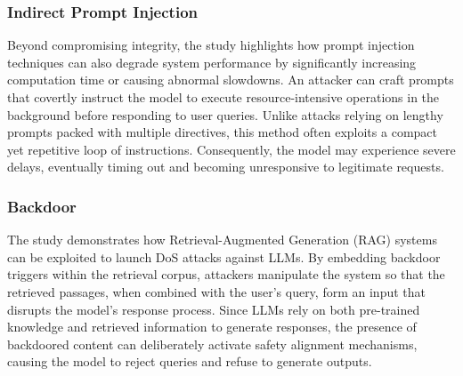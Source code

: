 \subsubsection{Indirect Prompt Injection}

Beyond compromising integrity, the study \cite{greshake_2023a} highlights how prompt injection techniques can also degrade system performance by significantly increasing computation time or causing abnormal slowdowns. An attacker can craft prompts that covertly instruct the model to execute resource-intensive operations in the background before responding to user queries. Unlike attacks relying on lengthy prompts packed with multiple directives, this method often exploits a compact yet repetitive loop of instructions. Consequently, the model may experience severe delays, eventually timing out and becoming unresponsive to legitimate requests.

\subsubsection{Backdoor}

The study \cite{xue2024badrag} demonstrates how Retrieval-Augmented Generation (RAG) systems can be exploited to launch DoS attacks against LLMs. By embedding backdoor triggers within the retrieval corpus, attackers manipulate the system so that the retrieved passages, when combined with the user’s query, form an input that disrupts the model’s response process. Since LLMs rely on both pre-trained knowledge and retrieved information to generate responses, the presence of backdoored content can deliberately activate safety alignment mechanisms, causing the model to reject queries and refuse to generate outputs.

